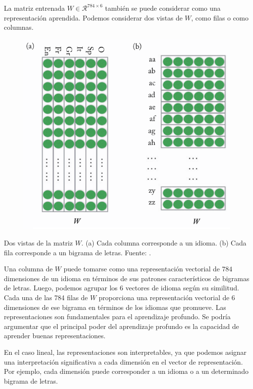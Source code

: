 La matriz entrenada $W \in \mathcal{R}^{784 \times 6}$ también se puede considerar como una representación aprendida. Podemos considerar dos vistas de $W$, como filas o como columnas.

\begin{figure}[htb]
	\centering
	 \includegraphics[scale=0.35]{pics/2rep.png}
\end{figure}

Dos vistas de la matriz $W$. (a) Cada columna corresponde a un idioma. (b) Cada fila corresponde a un bigrama de letras. Fuente: \cite{goldberg2017neural}.

Una columna de $W$ puede tomarse como una representación vectorial de $784$ dimensiones de un idioma en términos de sus patrones característicos de bigramas de letras. Luego, podemos agrupar los 6 vectores de idioma según su similitud. Cada una de las 784 filas de $W$ proporciona una representación vectorial de 6 dimensiones de ese bigrama en términos de los idiomas que promueve. Las representaciones son fundamentales para el aprendizaje profundo. Se podría argumentar que el principal poder del aprendizaje profundo es la capacidad de aprender buenas representaciones.

En el caso lineal, las representaciones son interpretables, ya que podemos asignar una interpretación significativa a cada dimensión en el vector de representación. Por ejemplo, cada dimensión puede corresponder a un idioma o a un determinado bigrama de letras.

